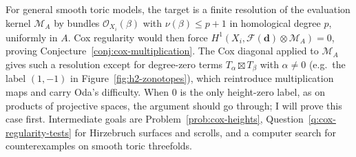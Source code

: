 \documentclass[11pt,reqno]{amsart}
\newtheorem{lemma}{Lemma}[section]
\newtheorem{question}[lemma]{Question}
\theoremstyle{remark}
\newcommand{\Ext}{\operatorname{Ext}}
\newcommand{\Cox}{\operatorname{Cox}}
\newcommand{\dd}{\mathbf{d}}
\newcommand{\zero}{\mathbf{0}}
\newcommand{\PP}{\mathbb{P}}
\newcommand{\cE}{\mathcal{E}}
\newcommand{\cF}{\mathcal{F}}
\newcommand{\cH}{\mathcal{H}}
\newcommand{\cM}{\mathcal{M}}
\newcommand{\cO}{\mathcal{O}}
\begin{document}

For general smooth toric models, the target is a finite resolution of the evaluation kernel $\cM_A$ by bundles $\cO_{X_i}(\beta)$ with $\nu(\beta)\le p+1$ in homological degree $p$, uniformly in $A$. Cox regularity would then force $H^1(X_i,\cF(\dd)\otimes\cM_A)=0$, proving Conjecture~\ref{conj:cox-multiplication}. The Cox diagonal applied to $\cM_A$ gives such a resolution except for degree-zero terms $T_\alpha\boxtimes T_\beta$ with $\alpha\ne0$ (e.g.\ the label $(1,-1)$ in Figure~\ref{fig:h2-zonotopes}), which reintroduce multiplication maps and carry Oda's difficulty. When $0$ is the only height-zero label, as on products of projective spaces, the argument should go through; I will prove this case first. Intermediate goals are Problem~\ref{prob:cox-heights}, Question~\ref{q:cox-regularity-tests} for Hirzebruch surfaces and scrolls, and a computer search for counterexamples on smooth toric threefolds. 
%
%
\end{document}
